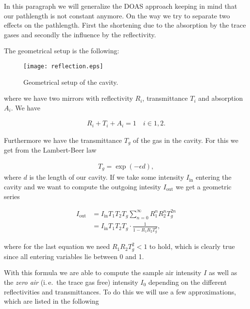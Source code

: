 In this paragraph we will generalize the DOAS approach keeping in mind
that our pathlength is not constant anymore. On the way we try to
separate two effects on the pathlength. First the shortening due to
the absorption by the trace gases and secondly the influence by the
reflectivity.

The geometrical setup is the following:

\begin{figure}[htbp]
  \centering
  \texttt{[image: reflection.eps]}
  \caption{Geometrical setup of the cavity.}
  \label{fig:cavity}
\end{figure}
where we have two mirrors with reflectivity $R_i$, transmittance $T_i$
and absorption $A_i$. We have

\begin{align*}
  R_i + T_i + A_i = 1 \quad i \in{1,2}.
\end{align*}

Furthermore we have the transmittance $T_g$ of the gas in the
cavity. For this we get from the Lambert-Beer law

\begin{align*}
  T_g = \exp(-\epsilon d),
\end{align*}
where $d$ is the length of our cavity. If we take some intensity
$I_{\text{in}}$ entering the cavity and we want to compute the outgoing
intesity $I_{\text{out}}$ we get a geometric series

\begin{align*}
  I_{\text{out}} & = I_{\text{in}} T_1 T_2 T_g \sum_{n=0}^\infty R_1^n R_2^n T_g^{2n}\\
  & = I_{\text{in}} T_1 T_2 T_g \cdot \frac{1}{1 - R_1R_2T_g^2},
\end{align*}

where for the last equation we need $R_1R_2T_g^2 < 1$ to hold, which
is clearly true since all entering variables lie between 0 and 1.

With this formula we are able to compute the sample air intensity $I$
as well as the \emph{zero air} (i.\,e.\ the trace gas free) intensity $I_0$
depending on the different reflectivities and transmittances. To do
this we will use a few approximations, which are listed in the
following

